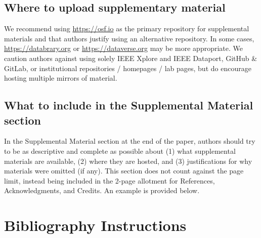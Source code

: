 \documentclass[journal]{vgtc}                %
\begin{document}
\subsection{Where to upload supplementary material}
We recommend using \url{https://osf.io} as the primary repository for supplemental materials and that authors justify using an alternative repository.
In some cases, \url{https://databrary.org} or \url{https://dataverse.org} may be more appropriate.
We caution authors against using solely IEEE Xplore and IEEE Dataport, GitHub \& GitLab, or institutional repositories / homepages / lab pages, but do encourage hosting multiple mirrors of material.

\subsection{What to include in the Supplemental Material section}

In the Supplemental Material section at the end of the paper, authors should try to be as descriptive and complete as possible about (1) what supplemental materials are available, (2) where they are hosted, and (3) justifications for why materials were omitted (if any).
This section does not count against the page limit, instead being included in the 2-page allotment for References, Acknowledgments, and Credits.
An example is provided below.

\section{Bibliography Instructions}
\label{sec:bib_inst}
\end{document}

